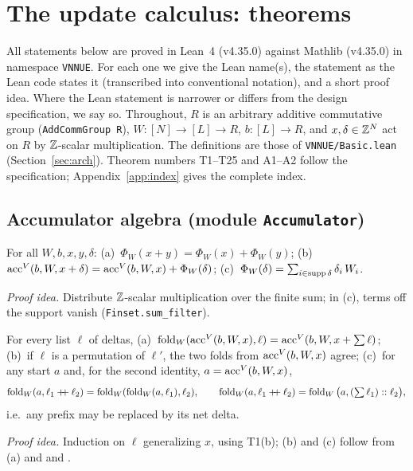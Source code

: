 \section{The update calculus: theorems}\label{sec:theorems}

All statements below are proved in Lean~4 (v4.35.0) against Mathlib (v4.35.0) in namespace \texttt{VNNUE}.
For each one we give the Lean name(s), the statement as the Lean code states it (transcribed into conventional notation), and a short proof idea.
Where the Lean statement is narrower or differs from the design specification, we say so.
Throughout, $R$ is an arbitrary additive commutative group (\texttt{AddCommGroup R}), $W:[N]\to[L]\to R$, $b:[L]\to R$, and $x,\delta\in\mathbb{Z}^N$ act on $R$ by $\mathbb{Z}$-scalar multiplication.
The definitions are those of \texttt{VNNUE/Basic.lean} (Section~\ref{sec:arch}).
Theorem numbers T1--T25 and A1--A2 follow the specification; Appendix~\ref{app:index} gives the complete index.

\subsection{Accumulator algebra (module \texttt{Accumulator})}

\begin{theorem}\label{thm:t1}
For all $W,b,x,y,\delta$:
(a)~$\Phi_W(x+y)=\Phi_W(x)+\Phi_W(y)$;
(b)~$\mathrm{acc}^{V}(b,W,x+\delta)=\mathrm{acc}^{V}(b,W,x)+\Phi_W(\delta)$;
(c)~$\Phi_W(\delta)=\sum_{i\in\operatorname{supp}\delta}\delta_i\,W_i$.
\end{theorem}
\noindent\emph{Proof idea.} Distribute $\mathbb{Z}$-scalar multiplication over the finite sum; in (c), terms off the support vanish (\texttt{Finset.sum\_filter}).

\begin{theorem}\label{thm:t2}
For every list $\ell$ of deltas,
(a)~$\operatorname{fold}_W(\mathrm{acc}^{V}(b,W,x),\ell)=\mathrm{acc}^{V}(b,W,x+\textstyle\sum\ell)$;
(b)~if $\ell$ is a permutation of $\ell'$, the two folds from $\mathrm{acc}^{V}(b,W,x)$ agree;
(c)~for any start $a$ and, for the second identity, $a=\mathrm{acc}^{V}(b,W,x)$,
\[\operatorname{fold}_W(a,\ell_1\mathbin{+\!\!+}\ell_2)=\operatorname{fold}_W(\operatorname{fold}_W(a,\ell_1),\ell_2),\qquad \operatorname{fold}_W(a,\ell_1\mathbin{+\!\!+}\ell_2)=\operatorname{fold}_W\big(a,(\textstyle\sum\ell_1)::\ell_2\big),\]
i.e.\ any prefix may be replaced by its net delta.
\end{theorem}
\noindent\emph{Proof idea.} Induction on $\ell$ generalizing $x$, using T1(b); (b) and (c) follow from (a) and  and .

